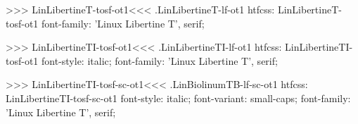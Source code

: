 {{{{{{{>>>
\<LinLibertineT-tosf-ot1\><<<
.LinLibertineT-lf-ot1
htfcss:  LinLibertineT-tosf-ot1  font-family: 'Linux Libertine T', serif;

>>>
\<LinLibertineTI-tosf-ot1\><<<
.LinLibertineTI-lf-ot1
htfcss:  LinLibertineTI-tosf-ot1  font-style: italic; font-family: 'Linux Libertine T', serif;

>>>
\<LinLibertineTI-tosf-sc-ot1\><<<
.LinBiolinumTB-lf-sc-ot1
htfcss:  LinLibertineTI-tosf-sc-ot1  font-style: italic; font-variant: small-caps; font-family: 'Linux Libertine T', serif;

}}}}}}}
